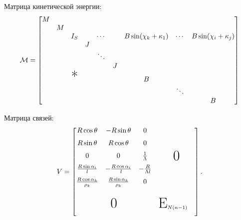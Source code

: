Матрица кинетической энергии:
$$
\M = \begin{bmatrix}
    M &   &               &   &        &   &                        &        &                        \\
      & M &               &   &        &   &                        &        &                        \\
      &   & I_S           &   & \cdots &   & B\sin(\chi_k+\kappa_1) & \cdots & B\sin(\chi_i+\kappa_j) \\
      &   &               & J &        &   &                        &        &                        \\
      &   &               &   & \ddots &   &                        &        &                        \\
      &   &               &   &        & J &                        &        &                        \\
      &   & \text{\huge*} &   &        &   & B                      &        &                        \\
      &   &               &   &        &   &                        & \ddots &                        \\
      &   &               &   &        &   &                        &        & B                      \\
\end{bmatrix}
$$

Матрица связей:
$$
V = \begin{bmatrix}
    \begin{matrix}
        R\cos\theta                  & -R\sin\theta                  & 0                    \\[6pt]
        R\sin\theta                  &  R\cos\theta                  & 0                    \\[6pt]
        0                            & 0                             & \frac{1}{\Lambda}    \\[6pt]
        \frac{R\sin\alpha_i}{l}      & -\frac{R\cos\alpha_i}{l}      & -\frac{R}{\Lambda l} \\[6pt]
        \frac{R\cos\alpha_k}{\rho_k} &  \frac{R\sin\alpha_k}{\rho_k} & 0                    \\[6pt]
    \end{matrix}   & \text{\huge 0}                \\[50pt]
    \text{\huge 0} & \text{\huge E}_{N(n-1)} \quad \\[10pt]
\end{bmatrix}.
$$

